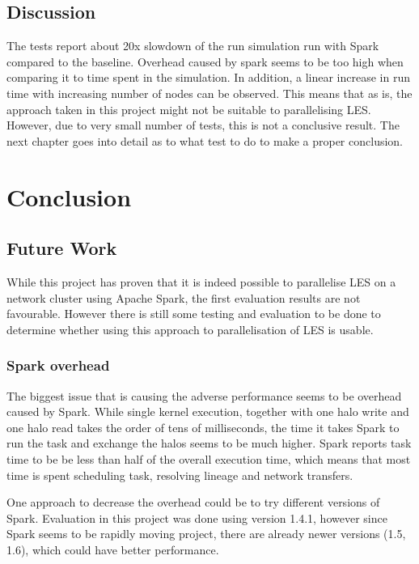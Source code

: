 \documentclass{l4proj}
\begin{document}
\section{Discussion}

The tests report about 20x slowdown of the run simulation run with Spark compared to
the baseline. Overhead caused by spark seems to be too high when comparing it to time spent 
in the simulation. In addition, a linear increase in run time with increasing number of nodes
can be observed. This means that as is, the approach taken in this project might not
be suitable to parallelising LES. However, due to very small number of tests, 
this is not a conclusive result. The next chapter goes into detail as to what test
to do to make a proper conclusion.

\chapter{Conclusion}
\label{chap:conclusion}

\section{Future Work}

While this project has proven that it is indeed possible to parallelise LES
on a network cluster using Apache Spark, the first evaluation results are
not favourable. However there is still some testing and evaluation to be done
to determine whether using this approach to parallelisation of LES is usable.

\subsection{Spark overhead}

The biggest issue that is causing the adverse performance seems to be overhead
caused by Spark. While single kernel execution, together with one halo write and
one halo read takes the order of tens of milliseconds, the time it takes Spark
to run the task and exchange the halos seems to be much higher. Spark reports
task time to be be less than half of the overall execution time, which means
that most time is spent scheduling task, resolving lineage and network transfers.

One approach to decrease the overhead could be to try different versions of Spark.
Evaluation in this project was done using version 1.4.1, however since Spark 
seems to be rapidly moving project, there are already newer versions (1.5, 1.6), which could have 
better performance.
\end{document}
